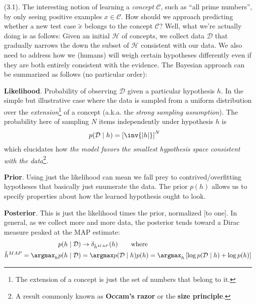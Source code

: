 \documentclass[11pt]{article}
\newcommand\p{\Needspace{10\baselineskip} \noindent}
\begin{document}
\p {} (3.1). The interesting notion of learning a \textit{concept} $\mathcal C$, such as ``all prime numbers'', by only seeing positive examples $x \in \mathcal C$. How should we approach predicting whether a new test case $\widetilde x$ belongs to the concept $\mathcal C$? Well, what we're actually doing is as follows: Given an initial  $\mathcal H$ of concepts, we collect data $\mathcal D$ that gradually narrows the down the subset of $\mathcal H$ consistent with our data. We also need to address how we (humans) will weigh certain hypotheses differently even if they are both entirely consistent with the evidence. The Bayesian approach can be summarized as follows (no particular order):
\begin{compactitem}
	\item \textbf{Likelihood}. Probability of observing $\mathcal D$ given a particular hypothesis $h$. In the simple but illustrative case where the data is sampled from a uniform distribution over the \textit{extension}\footnote{The extension of a concept is just the set of numbers that belong to it.} of a concept (a.k.a. the \textit{strong sampling assumption}). The probability here of sampling $N$ items independently under hypothesis $h$ is 
	\begin{align}
		p(\mathcal D \mid h) 
			&= \left[  \inv{|h|} \right]^N
	\end{align}
	which elucidates how \textit{the model favors the smallest hypothesis space consistent with the data}\footnote{A result commonly known as \textbf{Occam's razor} or the \textbf{size principle}.}.
	
	\item \textbf{Prior}. Using just the likelihood can mean we fall prey to contrived/overfitting hypotheses that basically just enumerate the data. The prior $p(h)$ allows us to specify properties about how the learned hypothesis ought to look. 
	
	\item \textbf{Posterior}. This is just the likelihood times the prior, normalized [to one]. In general, as we collect more and more data, the posterior tends toward a Dirac measure peaked at the MAP estimate:
	\begin{align}
		p(h \mid \mathcal D) &\rightarrow \delta_{\hat h^{MAP}} (h) \qquad \text{where} \\
		\hat h^{MAP} 
			= \argmax_h p(h \mid \mathcal D) &= \argmax p(\mathcal D \mid h) p(h)
			= \argmax_h \left[ 
					\log p(\mathcal D \mid h) + \log p(h)
				\right]
	\end{align}
\end{compactitem}
\end{document}
